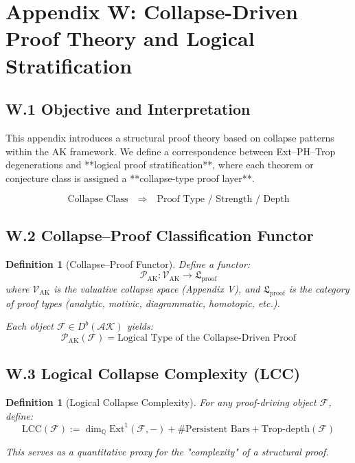 \documentclass[11pt]{article}
\newtheorem{definition}[theorem]{Definition}
\begin{document}

\section*{Appendix W: Collapse-Driven Proof Theory and Logical Stratification}

\subsection*{W.1 Objective and Interpretation}

This appendix introduces a structural proof theory based on collapse patterns within the AK framework.  
We define a correspondence between Ext–PH–Trop degenerations and **logical proof stratification**,  
where each theorem or conjecture class is assigned a **collapse-type proof layer**.

\[
\boxed{
\text{Collapse Class} \quad \Rightarrow \quad \text{Proof Type / Strength / Depth}
}
\]

\subsection*{W.2 Collapse–Proof Classification Functor}

\begin{definition}[Collapse–Proof Functor]
Define a functor:
\[
\mathscr{P}_{\mathrm{AK}} : \mathscr{V}_{\mathrm{AK}} \to \mathfrak{L}_{\mathrm{proof}}
\]
where \( \mathscr{V}_{\mathrm{AK}} \) is the valuative collapse space (Appendix V),  
and \( \mathfrak{L}_{\mathrm{proof}} \) is the category of proof types (analytic, motivic, diagrammatic, homotopic, etc.).

Each object \( \mathcal{F} \in D^b(\mathcal{AK}) \) yields:
\[
\mathscr{P}_{\mathrm{AK}}(\mathcal{F}) = \text{Logical Type of the Collapse-Driven Proof}
\]
\end{definition}

\subsection*{W.3 Logical Collapse Complexity (LCC)}

\begin{definition}[Logical Collapse Complexity]
For any proof-driving object \( \mathcal{F} \), define:
\[
\mathrm{LCC}(\mathcal{F}) := \dim_{\mathbb{Q}} \mathrm{Ext}^1(\mathcal{F}, -) + \# \text{Persistent Bars} + \mathrm{Trop\text{-}depth}(\mathcal{F})
\]

This serves as a quantitative proxy for the "complexity" of a structural proof.
\end{definition}
\end{document}

